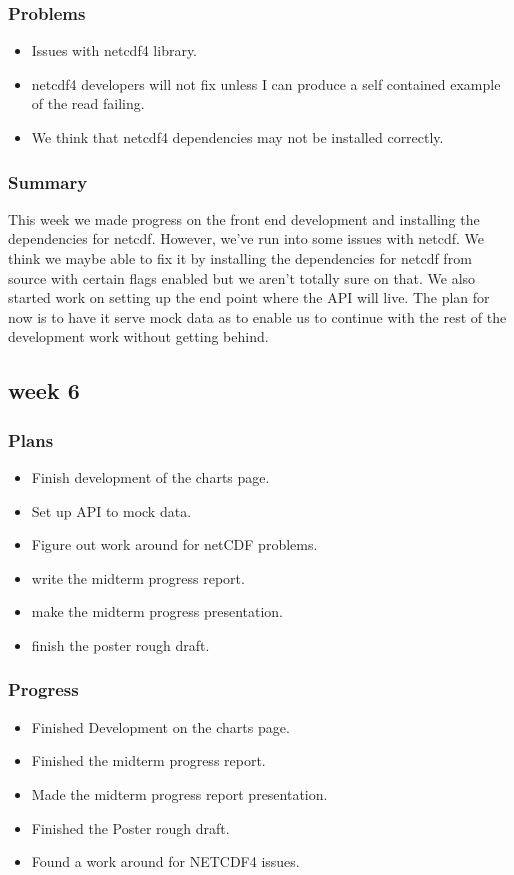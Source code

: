 \documentclass[onecolumn, draftclsnofoot,10pt, compsoc]{article}
\begin{document}
			\subsubsection{Problems}
				\begin{itemize}
					\item Issues with netcdf4 library.
					\item netcdf4 developers will not fix unless I can produce a self contained example of the read failing.
					\item We think that netcdf4 dependencies may not be installed correctly.
				\end{itemize}

			\subsubsection{Summary}
			 This week we made progress on the front end development and installing the dependencies for netcdf. However, we've run into some issues with netcdf. We think we maybe able to fix it by installing the dependencies for netcdf from source with certain flags enabled but we aren't totally sure on that. We also started work on setting up the end point where the API will live. The plan for now is to have it serve mock data as to enable us to continue with the rest of the development work without getting behind.\\

		\subsection{week 6}
			\subsubsection{Plans}
				\begin{itemize}
					\item Finish development of the charts page.
					\item Set up API to mock data.
					\item Figure out work around for netCDF problems.
					\item write the midterm progress report.
					\item make the midterm progress presentation.
					\item finish the poster rough draft.
				\end{itemize}
			\subsubsection{Progress}
				\begin{itemize}
					\item Finished Development on the charts page.
					\item Finished the midterm progress report.
					\item Made the midterm progress report presentation.
					\item Finished the Poster rough draft.
					\item Found a work around for NETCDF4 issues.
				\end{itemize}
\end{document}
